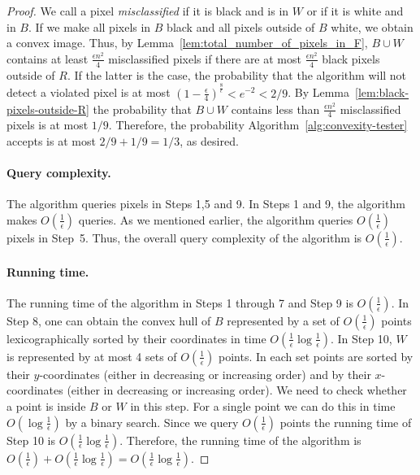 \documentclass[11pt,english]{article}
\numberwithin{figure}{section}
\newcommand{\eps}{{\epsilon}}
\begin{document}
\begin{proof}
We call a pixel {\em misclassified} if it is black and is in $W$ or if it is white and in $B$.
If we make all pixels in $B$ black and all pixels outside of $B$ white, we obtain a
convex image. Thus, by Lemma~\ref{lem:total_number_of_pixels_in_F},
$B\cup W$ contains at least $\frac{\eps n^{2}}{4}$ misclassified pixels if there are
at most $\frac{\eps n^{2}}{4}$ black pixels outside of $R$. If the latter is the
case, the probability that the algorithm will not detect a violated pixel
is at most $(1-\frac{\eps}{4})^{\frac{8}{\eps}}<e^{-2}<2/9$. By
Lemma~\ref{lem:black-pixels-outside-R} the probability that $B\cup W$
contains less than $\frac{\eps n^{2}}{4}$ misclassified pixels is at most
$1/9$.
Therefore, the probability Algorithm~\ref{alg:convexity-tester} accepts is at most
$2/9+1/9=1/3$, as desired.
\paragraph{Query complexity.} The algorithm queries pixels in Steps 1,5 and 9.
In Steps 1 and 9, the algorithm makes $O(\frac{1}{\eps})$ queries. As we mentioned earlier, the
algorithm queries $O(\frac{1}{\eps})$ pixels in Step~5. Thus, the overall query
complexity of the algorithm is $O(\frac{1}{\eps})$.

\paragraph{Running time.} The running time of the algorithm in Steps 1 through
7 and Step 9 is $O(\frac{1}{\eps})$. In Step 8, one can
obtain the convex hull of $B$ represented by a set of
$O(\frac{1}{\eps})$ points lexicographically sorted by their coordinates
in time $O(\frac{1}{\eps}\log \frac{1}{\eps})$. In Step 10, $W$ is represented
by at most 4 sets of $O(\frac{1}{\eps})$ points. In each set points are sorted
by their $y$-coordinates (either in decreasing or increasing order) and by
their $x$-coordinates (either in decreasing or increasing order).
We need to check whether a point is inside $B$ or $W$ in this step. For a single point we can do
this in time $O(\log \frac{1}{\eps})$ by a
binary search. Since we query $O(\frac{1}{\eps})$ points the running
time of Step 10 is $O(\frac{1}{\eps}\log \frac{1}{\eps})$. Therefore, the running time
of the algorithm is $O(\frac{1}{\eps})+O(\frac{1}{\eps}\log \frac{1}{\eps})=O(\frac{1}{\eps}\log \frac{1}{\eps})$.
\end{proof}
\end{document}
